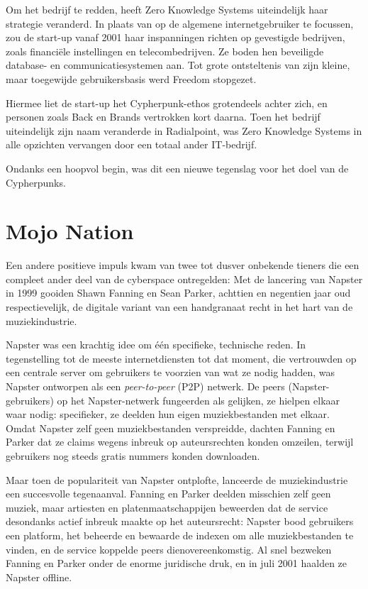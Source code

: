 \documentclass[smalldemyvopaper,11pt,twoside,onecolumn,openright,extrafontsizes,hidelinks]{memoir}
\begin{document}
Om het bedrijf te redden, heeft Zero Knowledge Systems uiteindelijk haar
strategie veranderd. In plaats van op de algemene internetgebruiker te
focussen, zou de start-up vanaf 2001 haar inspanningen richten op
gevestigde bedrijven, zoals financiële instellingen en telecombedrijven.
Ze boden hen beveiligde database- en communicatiesystemen aan. Tot grote
ontsteltenis van zijn kleine, maar toegewijde gebruikersbasis werd
Freedom stopgezet.

Hiermee liet de start-up het Cypherpunk-ethos grotendeels achter zich,
en personen zoals Back en Brands vertrokken kort daarna. Toen het
bedrijf uiteindelijk zijn naam veranderde in Radialpoint, was Zero
Knowledge Systems in alle opzichten vervangen door een totaal ander
IT-bedrijf.

Ondanks een hoopvol begin, was dit een nieuwe tegenslag voor het doel
van de Cypherpunks.

\section{Mojo Nation}\label{mojo-nation}

Een andere positieve impuls kwam van twee tot dusver onbekende tieners
die een compleet ander deel van de cyberspace ontregelden: Met de
lancering van Napster in 1999 gooiden Shawn Fanning en Sean Parker,
achttien en negentien jaar oud respectievelijk, de digitale variant van
een handgranaat recht in het hart van de muziekindustrie.

Napster was een krachtig idee om één specifieke, technische reden. In
tegenstelling tot de meeste internetdiensten tot dat moment, die
vertrouwden op een centrale server om gebruikers te voorzien van wat ze
nodig hadden, was Napster ontworpen als een \emph{peer-to-peer} (P2P)
netwerk. De peers (Napster-gebruikers) op het Napster-netwerk fungeerden
als gelijken, ze hielpen elkaar waar nodig: specifieker, ze deelden hun
eigen muziekbestanden met elkaar. Omdat Napster zelf geen
muziekbestanden verspreidde, dachten Fanning en Parker dat ze claims
wegens inbreuk op auteursrechten konden omzeilen, terwijl gebruikers nog
steeds gratis nummers konden downloaden.

Maar toen de populariteit van Napster ontplofte, lanceerde de
muziekindustrie een succesvolle tegenaanval. Fanning en Parker deelden
misschien zelf geen muziek, maar artiesten en platenmaatschappijen
beweerden dat de service desondanks actief inbreuk maakte op het
auteursrecht: Napster bood gebruikers een platform, het beheerde en
bewaarde de indexen om alle muziekbestanden te vinden, en de service
koppelde peers dienovereenkomstig. Al snel bezweken Fanning en Parker
onder de enorme juridische druk, en in juli 2001 haalden ze Napster
offline.
\end{document}
